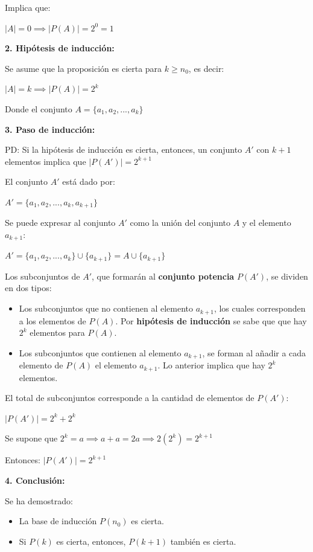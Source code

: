 \documentclass{article}
\begin{document}
Implica que:

$\left|A\right| = 0 \implies \left|P(A)\right| = 2^0 = 1$

\textbf{2. Hipótesis de inducción:}

Se asume que la proposición es cierta para $k \ge n_0$, es decir:

$\left|A\right| = k \implies \left|P(A)\right| = 2^k$

Donde el conjunto $A = \{a_1, a_2, ..., a_k\}$

\textbf{3. Paso de inducción:}

PD: Si la hipótesis de inducción es cierta, entonces, un conjunto $A'$ con $k + 1$ elementos implica que $\left|P(A')\right| = 2^{k + 1}$

El conjunto $A'$ está dado por:

$A' = \{a_1, a_2, ..., a_k, a_{k+1}\}$

Se puede expresar al conjunto $A'$ como la unión del conjunto $A$ y el elemento $a_{k+1}$:

$A' = \{a_1, a_2, ..., a_k\} \cup \{a_{k + 1}\} = A \cup \{a_{k+1}\}$

Los subconjuntos de $A'$, que formarán al \textbf{conjunto potencia} $P(A')$, se dividen en dos tipos:

\begin{itemize}
    \item Los subconjuntos que no contienen al elemento $a_{k + 1}$, los cuales corresponden a los elementos de $P(A)$. Por \textbf{hipótesis de inducción} se sabe que que hay $2^k$ elementos para $P(A)$.

    \item Los subconjuntos que contienen al elemento $a_{k + 1}$, se forman al añadir a cada elemento de $P(A)$ el elemento $a_{k + 1}$. Lo anterior implica que hay $2^k$ elementos.
\end{itemize}

El total de subconjuntos corresponde a la cantidad de elementos de $P(A')$:

$\left|P(A')\right| = 2^k + 2^k$

Se supone que $2^k = a \implies a + a = 2a \implies 2(2^k) = 2^{k + 1}$

Entonces: $\left|P(A')\right| = 2^{k + 1}$

\textbf{4. Conclusión:}

Se ha demostrado:

\begin{itemize}
    \item La base de inducción $P(n_0)$ es cierta.
    \item Si $P(k)$ es cierta, entonces, $P(k + 1)$ también es cierta.
\end{itemize}
\end{document}
